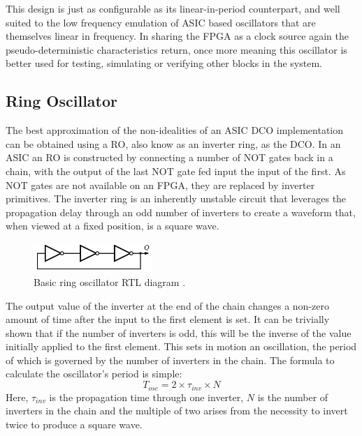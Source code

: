 This design is just as configurable as its linear-in-period counterpart, and well suited to the low frequency emulation of \ac{ASIC} based oscillators that are themselves linear in frequency. In sharing the \ac{FPGA} as a clock source again the pseudo-deterministic characteristics return, once more meaning this oscillator is better used for testing, simulating or verifying other blocks in the system.

\subsection{Ring Oscillator}
The best approximation of the non-idealities of an \ac{ASIC} \ac{DCO} implementation can be obtained using a \ac{RO}, also know as an inverter ring, as the \ac{DCO}. In an \ac{ASIC} an \ac{RO} is constructed by connecting a number of NOT gates back in a chain, with the output of the last NOT gate fed input the input of the first. As NOT gates are not available on an \ac{FPGA}, they are replaced by inverter primitives. The inverter ring is an inherently unstable circuit that leverages the propagation delay through an odd number of inverters to create a waveform that, when viewed at a fixed position, is a square wave. 
\begin{figure}[h]
	\centering
	\includegraphics[width=0.4\textwidth]{../RO-wiki}
	\caption[Basic ring oscillator \ac{RTL} diagram]{Basic ring oscillator \ac{RTL} diagram \cite{ro_wiki}.}
	\label{fig:ro_wiki}
\end{figure}

The output value of the inverter at the end of the chain changes a non-zero amount of time after the input to the first element is set. It can be trivially shown that if the number of inverters is odd, this will be the inverse of the value initially applied to the first element. This sets in motion an oscillation, the period of which is governed by the number of inverters in the chain. The formula to calculate the oscillator's period is simple:
\begin{equation}
	T_{osc} = 2\times \tau_{inv} \times N
\end{equation}
Here, $\tau_{inv}$ is the propagation time through one inverter, $N$ is the number of inverters in the chain and the multiple of two arises from the necessity to invert twice to produce a square wave.

